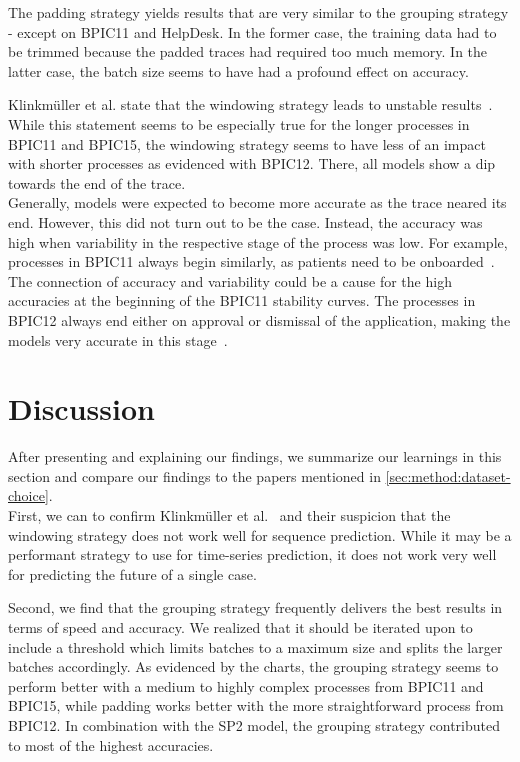 The padding strategy yields results that are very similar to the grouping strategy - except on BPIC11 and HelpDesk. In the former case, the training data had to be trimmed because the padded traces had required too much memory. In the latter case, the batch size seems to have had a profound effect on accuracy.

Klinkmüller et al. state that the windowing strategy leads to unstable results~\cite{klinkmuller2018reliablemonitoring}. While this statement seems to be especially true for the longer processes in BPIC11 and BPIC15, the windowing strategy seems to have less of an impact with shorter processes as evidenced with BPIC12. There, all models show a dip towards the end of the trace.\\

Generally, models were expected to become more accurate as the trace neared its end. However, this did not turn out to be the case. Instead, the accuracy was high when variability in the respective stage of the process was low. For example, processes in BPIC11 always begin similarly, as patients need to be onboarded~\cite{bose2011analysis}. The connection of accuracy and variability could be a cause for the high accuracies at the beginning of the BPIC11 stability curves. The processes in BPIC12 always end either on approval or dismissal of the application, making the models very accurate in this stage~\cite{adriansyah2012mining}.

\section{Discussion}\label{sec:eval:discussion}
After presenting and explaining our findings, we summarize our learnings in this section and compare our findings to the papers mentioned in \autoref{sec:method:dataset-choice}.\\

First, we can to confirm Klinkmüller et al.~\cite{klinkmuller2018reliablemonitoring} and their suspicion that the windowing strategy does not work well for sequence prediction. While it may be a performant strategy to use for time-series prediction, it does not work very well for predicting the future of a single case.

Second, we find that the grouping strategy frequently delivers the best results in terms of speed and accuracy. We realized that it should be iterated upon to include a threshold which limits batches to a maximum size and splits the larger batches accordingly. As evidenced by the charts, the grouping strategy seems to perform better with a medium to highly complex processes from BPIC11 and BPIC15, while padding works better with the more straightforward process from BPIC12. In combination with the SP2 model, the grouping strategy contributed to most of the highest accuracies.

